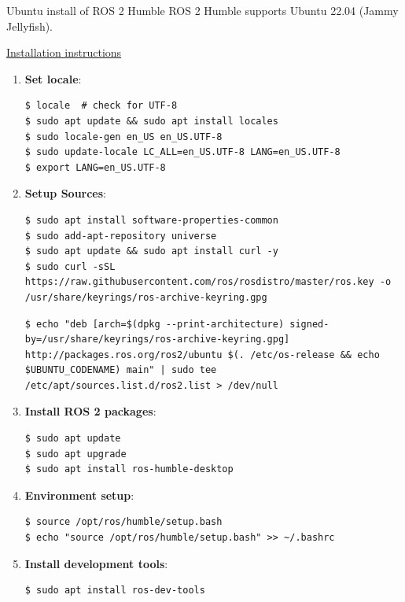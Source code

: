 \begin{frame}{Ubuntu install of ROS 2 Humble}
    ROS 2 Humble supports Ubuntu 22.04 (Jammy Jellyfish).

    \href{https://docs.ros.org/en/humble/Installation/Ubuntu-Install-Debs.html}{Installation instructions}

    \begin{enumerate}
        \item \textbf{Set locale}:
              \begin{lstlisting}[language=shell]
$ locale  # check for UTF-8
$ sudo apt update && sudo apt install locales
$ sudo locale-gen en_US en_US.UTF-8
$ sudo update-locale LC_ALL=en_US.UTF-8 LANG=en_US.UTF-8
$ export LANG=en_US.UTF-8
\end{lstlisting}

        \item \textbf{Setup Sources}:
              \begin{lstlisting}[language=shell]
$ sudo apt install software-properties-common
$ sudo add-apt-repository universe
$ sudo apt update && sudo apt install curl -y
$ sudo curl -sSL https://raw.githubusercontent.com/ros/rosdistro/master/ros.key -o /usr/share/keyrings/ros-archive-keyring.gpg
\end{lstlisting}

              \framebreak

              \begin{lstlisting}[language=shell]
$ echo "deb [arch=$(dpkg --print-architecture) signed-by=/usr/share/keyrings/ros-archive-keyring.gpg] http://packages.ros.org/ros2/ubuntu $(. /etc/os-release && echo $UBUNTU_CODENAME) main" | sudo tee /etc/apt/sources.list.d/ros2.list > /dev/null
\end{lstlisting}

        \item \textbf{Install ROS 2 packages}:
              \begin{lstlisting}[language=shell]
$ sudo apt update
$ sudo apt upgrade
$ sudo apt install ros-humble-desktop
\end{lstlisting}

        \item \textbf{Environment setup}:
              \begin{lstlisting}[language=shell]
$ source /opt/ros/humble/setup.bash
$ echo "source /opt/ros/humble/setup.bash" >> ~/.bashrc
\end{lstlisting}

        \item \textbf{Install development tools}:
              \begin{lstlisting}[language=shell]
$ sudo apt install ros-dev-tools
\end{lstlisting}
    \end{enumerate}
\end{frame}

